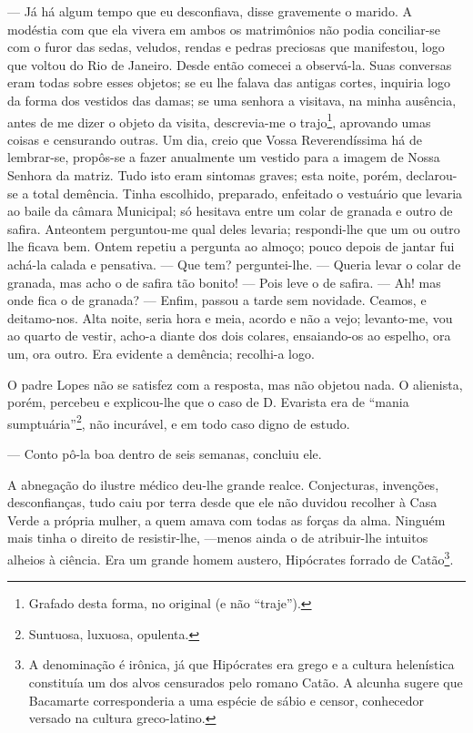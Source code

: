 --- Já há algum tempo que eu desconfiava, disse gravemente o marido. A
modéstia com que ela vivera em ambos os matrimônios não podia
conciliar-se com o furor das sedas, veludos, rendas e pedras preciosas
que manifestou, logo que voltou do Rio de Janeiro. Desde então comecei a
observá-la. Suas conversas eram todas sobre esses objetos; se eu lhe
falava das antigas cortes, inquiria logo da forma dos vestidos das
damas; se uma senhora a visitava, na minha ausência, antes de me dizer o
objeto da visita, descrevia-me o trajo\footnote{Grafado desta forma, no
  original (e não ``traje'').}, aprovando umas coisas e censurando
outras. Um dia, creio que Vossa Reverendíssima há de lembrar-se,
propôs-se a fazer anualmente um vestido para a imagem de Nossa Senhora
da matriz. Tudo isto eram sintomas graves; esta noite, porém,
declarou-se a total demência. Tinha escolhido, preparado, enfeitado o
vestuário que levaria ao baile da câmara Municipal; só hesitava entre um
colar de granada e outro de safira. Anteontem perguntou-me qual deles
levaria; respondi-lhe que um ou outro lhe ficava bem. Ontem repetiu a
pergunta ao almoço; pouco depois de jantar fui achá-la calada e
pensativa. --- Que tem? perguntei-lhe. --- Queria levar o colar de
granada, mas acho o de safira tão bonito! --- Pois leve o de safira. ---
Ah! mas onde fica o de granada? --- Enfim, passou a tarde sem novidade.
Ceamos, e deitamo-nos. Alta noite, seria hora e meia, acordo e não a
vejo; levanto-me, vou ao quarto de vestir, acho-a diante dos dois
colares, ensaiando-os ao espelho, ora um, ora outro. Era evidente a
demência; recolhi-a logo.

O padre Lopes não se satisfez com a resposta, mas não objetou nada. O
alienista, porém, percebeu e explicou-lhe que o caso de D. Evarista era
de ``mania sumptuária''\footnote{Suntuosa, luxuosa, opulenta.}, não
incurável, e em todo caso digno de estudo.

--- Conto pô-la boa dentro de seis semanas, concluiu ele.

A abnegação do ilustre médico deu-lhe grande realce. Conjecturas,
invenções, desconfianças, tudo caiu por terra desde que ele não duvidou
recolher à Casa Verde a própria mulher, a quem amava com todas as forças
da alma. Ninguém mais tinha o direito de resistir-lhe, ---menos ainda o
de atribuir-lhe intuitos alheios à ciência. Era um grande homem austero,
Hipócrates forrado de Catão\footnote{A denominação é irônica, já que
  Hipócrates era grego e a cultura helenística constituía um dos alvos
  censurados pelo romano Catão. A alcunha sugere que Bacamarte
  corresponderia a uma espécie de sábio e censor, conhecedor versado na
  cultura greco-latino.}.

